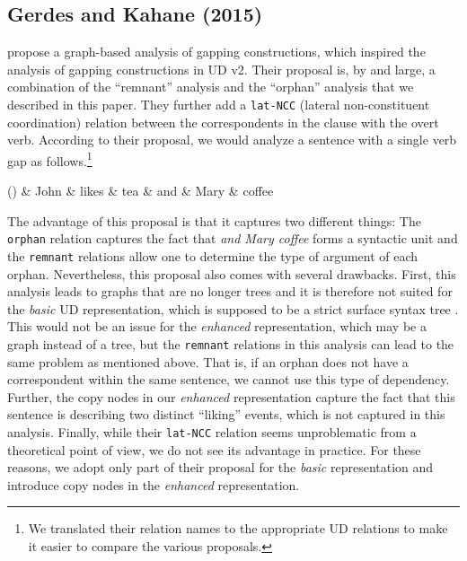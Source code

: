 \documentclass[11pt]{article}
\newenvironment{myquote}%
  {\list{}{\leftmargin=0.0in\rightmargin=0.0in}\item[]}%
  {\endlist}
\newcounter{excounter}
\begin{document}
\subsection{Gerdes and Kahane (2015)}

 propose a graph-based analysis of gapping constructions, which inspired the analysis of gapping constructions in UD v2. Their proposal is, by and large, a combination of the ``remnant'' analysis and the ``orphan'' analysis that we described in this paper. They further add a \texttt{lat-NCC} (lateral non-constituent coordination) relation between the correspondents in the clause with the overt verb. According to their proposal, we would analyze a sentence with a single verb gap as follows.\footnote{We translated their relation names to the appropriate UD relations to make it easier to compare the various proposals.}
\begin{myquote}
\label{ex:en-gerdes}
\footnotesize
  \begin{dependency}[edge unit distance=2.4ex]
    \begin{deptext}[column sep=0.3cm]
      (\theexcounter) \& John \& likes \& tea \& and \& Mary \& coffee \\
    \end{deptext}
  \end{dependency}
\end{myquote}
The advantage of this proposal is that it captures two different things: The \texttt{orphan} relation captures the fact that \textit{and Mary coffee} forms a syntactic unit and the \texttt{remnant} relations allow one to determine the type of argument of each orphan. Nevertheless, this proposal also comes with several drawbacks. First, this analysis leads to graphs that are no longer trees and it is therefore not suited for the \textit{basic} UD representation, which is supposed to be a strict surface syntax tree \cite{Nivre2016}. This would not be an issue for the \textit{enhanced} representation, which may be a graph instead of a tree, but the \texttt{remnant} relations in this analysis can lead to the same problem as mentioned above. That is, if an orphan does not have a correspondent within the same sentence, we cannot use this type of dependency. Further, the copy nodes in our \textit{enhanced} representation capture the fact that this sentence is describing two distinct ``liking'' events, which is not captured in this analysis. Finally, while their \texttt{lat-NCC} relation seems unproblematic from a theoretical point of view, we do not see its advantage in practice. For these reasons, we adopt only part of their proposal for the \textit{basic} representation and introduce copy nodes in the \textit{enhanced} representation.
\end{document}
